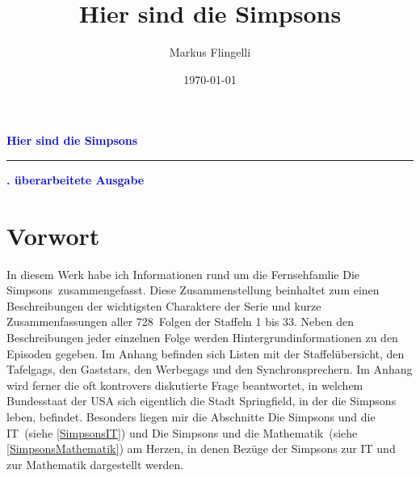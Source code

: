 \documentclass[pagesize,twoside,german]{scrbook}
\author{Markus Flingelli}
\date{\today}
\title{Hier sind die Simpsons}
\newcommand{\staffelAnzahl}{33}
\newcommand{\episodenAnzahl}{728}
\begin{document}
\setcounter{page}{1}

\def\datengerman{\def\today{\ifnum\day<10 0\fi\number\day.\ifnum\month<10 0\fi\number\month.\number\year}}

{}


\HTMLOutput{}
{
}

  
\HTMLOutput{
\maketitle
}
{
\vspace*{3ex}
\pagecolor{titleColor}\afterpage{\nopagecolor}
\vspace*{8cm}
\begin{flushleft}
  \Huge\textcolor{blue}{\textbf{\sffamily Hier sind die Simpsons}}\\
  \textcolor{blue}{\rule{\linewidth}{4pt}}
  \vspace{2ex}
  \huge\textcolor{blue}{\textbf{. überarbeitete Ausgabe}}
\end{flushleft}

\newpage
}

{}

\section*{Vorwort}
In diesem Werk habe ich Informationen rund um die Fernsehfamlie \glqq Die Simpsons\grqq\ zusammengefasst. Diese Zusammenstellung beinhaltet zum einen Beschreibungen der wichtigsten Charaktere der Serie und kurze Zusammenfassungen aller \episodenAnzahl\ Folgen der Staffeln 1 bis \staffelAnzahl . Neben den Beschreibungen jeder einzelnen Folge werden Hintergrundinformationen zu den Episoden gegeben. Im Anhang befinden sich Listen mit der Staffelübersicht, den Tafelgags, den Gaststars, den Werbegags und den Synchronsprechern. Im Anhang wird ferner die oft kontrovers diskutierte Frage beantwortet, in welchem Bundesstaat der USA sich eigentlich die Stadt Springfield, in der die Simpsons leben, befindet. Besonders liegen mir die Abschnitte \glqq Die Simpsons und die IT\grqq\ (siehe \ref{SimpsonsIT}) und \glqq Die Simpsons und die Mathematik\grqq\ (siehe \ref{SimpsonsMathematik}) am Herzen, in denen Bezüge der Simpsons zur IT und zur Mathematik dargestellt werden.
\end{document}
